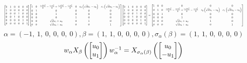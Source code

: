 \documentclass[11pt]{article}
\theoremstyle{definition}
\begin{document}
\[
\scaletoalign{\textwidth}{{\left[\begin{matrix}0 & 1 & 0 & 0 & 0 & 0\\1 & 0 & 0 & 0 & 0 & 0\\0 & 0 & 0 & 1 & 0 & 0\\0 & 0 & 1 & 0 & 0 & 0\\0 & 0 & 0 & 0 & 1 & 0\\0 & 0 & 0 & 0 & 0 & 1\end{matrix}\right]} {\left[\begin{matrix}1 & 0 & \frac{c_{0} d u_{1}^{2}}{2} - \frac{c_{0} u_{0}^{2}}{2} + \frac{c_{1} d u_{3}^{2}}{2} - \frac{c_{1} u_{2}^{2}}{2} & 0 & c_{0} \left(\sqrt{d} u_{1} - u_{0}\right) & c_{1} \left(\sqrt{d} u_{3} - u_{2}\right)\\0 & 1 & 0 & 0 & 0 & 0\\0 & 0 & 1 & 0 & 0 & 0\\0 & 0 & 0 & 1 & 0 & 0\\0 & 0 & \sqrt{d} u_{1} + u_{0} & 0 & 1 & 0\\0 & 0 & \sqrt{d} u_{3} + u_{2} & 0 & 0 & 1\end{matrix}\right]} {\left[\begin{matrix}0 & 1 & 0 & 0 & 0 & 0\\1 & 0 & 0 & 0 & 0 & 0\\0 & 0 & 0 & 1 & 0 & 0\\0 & 0 & 1 & 0 & 0 & 0\\0 & 0 & 0 & 0 & 1 & 0\\0 & 0 & 0 & 0 & 0 & 1\end{matrix}\right]} = {\left[\begin{matrix}1 & 0 & 0 & 0 & 0 & 0\\0 & 1 & 0 & \frac{c_{0} d u_{1}^{2}}{2} - \frac{c_{0} u_{0}^{2}}{2} + \frac{c_{1} d u_{3}^{2}}{2} - \frac{c_{1} u_{2}^{2}}{2} & c_{0} \left(\sqrt{d} u_{1} - u_{0}\right) & c_{1} \left(\sqrt{d} u_{3} - u_{2}\right)\\0 & 0 & 1 & 0 & 0 & 0\\0 & 0 & 0 & 1 & 0 & 0\\0 & 0 & 0 & \sqrt{d} u_{1} + u_{0} & 1 & 0\\0 & 0 & 0 & \sqrt{d} u_{3} + u_{2} & 0 & 1\end{matrix}\right]}}
\]
\[
\alpha = \left( -1, \  1, \  0, \  0, \  0, \  0\right), \beta = \left( 1, \  1, \  0, \  0, \  0, \  0\right), \sigma_{\alpha}(\beta) = \left( 1, \  1, \  0, \  0, \  0, \  0\right)
\]
\[
\scaletoalign{\textwidth}{w_{\alpha} X_{\beta}\left(\left[\begin{matrix}u_{0}\\u_{1}\end{matrix}\right]\right) w_{\alpha}^{-1} = X_{\sigma_{\alpha}\left(\beta\right)}\left(\left[\begin{matrix}u_{0}\\- u_{1}\end{matrix}\right]\right)}
\]
\end{document}
